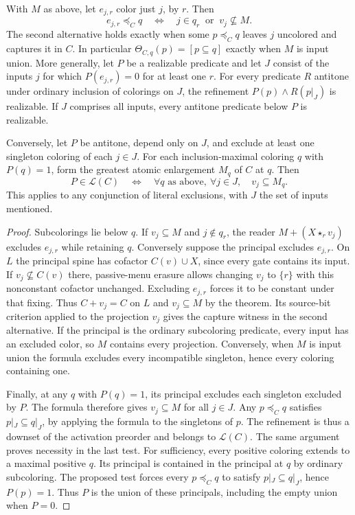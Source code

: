 \begin{corollary}
\label{core:cor:singleton-color-refinement}
With $M$ as above, let $e_{j,r}$ color just $j$, by $r$. Then
\[
 e_{j,r}\preceq_C q
 \quad\Longleftrightarrow\quad j\in q_r\ \text{ or }\ v_j\nsubseteq M .
\]
The second alternative holds exactly when some $p\preceq_Cq$ leaves
$j$ uncolored and captures it in $C$.
In particular $\Theta_{C,q}(p)=[p\subseteq q]$ exactly when $M$
is input union. More generally, let $P$ be a realizable predicate and
let $J$ consist of the inputs $j$ for which $P(e_{j,r})=0$ for at
least one $r$. For every predicate $R$ antitone under ordinary
inclusion of colorings on $J$, the refinement
$P(p)\land R(p|_J)$ is realizable. If $J$ comprises all inputs,
every antitone predicate below $P$ is realizable.

Conversely, let $P$ be antitone, depend only on $J$, and exclude at
least one singleton coloring of each $j\in J$. For each
inclusion-maximal coloring $q$ with $P(q)=1$, form the greatest
atomic enlargement $M_q$ of $C$ at $q$. Then
\[
 P\in\mathcal L(C)\quad\Longleftrightarrow\quad
 \forall q\text{ as above},\ \forall j\in J,\quad v_j\subseteq M_q .
\]
This applies to any conjunction of literal exclusions, with $J$ the
set of inputs mentioned.
\end{corollary}
\begin{proof}
Subcolorings lie below $q$. If $v_j\subseteq M$ and $j\notin q_r$,
the reader $M+(X\star_r v_j)$ excludes $e_{j,r}$ while retaining $q$.
Conversely suppose the principal excludes $e_{j,r}$. On $L$ the
principal spine has cofactor $C(v)\cup X$, since every gate contains
its input. If $v_j\nsubseteq C(v)$ there, passive-menu erasure
allows changing $v_j$ to $\{r\}$ with this nonconstant cofactor
unchanged. Excluding $e_{j,r}$ forces it to be constant under that
fixing. Thus $C+v_j=C$ on $L$ and $v_j\subseteq M$ by the theorem.
Its source-bit criterion applied to the projection $v_j$ gives the
capture witness in the second alternative.
If the principal is the ordinary subcoloring predicate, every input
has an excluded color, so $M$ contains every projection. Conversely,
when $M$ is input union the formula excludes every incompatible
singleton, hence every coloring containing one.

Finally, at any $q$ with $P(q)=1$, its principal excludes each
singleton excluded by $P$. The formula therefore gives $v_j\subseteq M$
for all $j\in J$. Any $p\preceq_Cq$ satisfies $p|_J\subseteq q|_J$,
by applying the formula to the singletons of $p$. The refinement is
thus a downset of the activation preorder and belongs to $\mathcal L(C)$.
The same argument proves necessity in the last test. For sufficiency,
every positive coloring extends to a maximal positive $q$. Its
principal is contained in the principal at $q$ by ordinary
subcoloring. The proposed test forces every $p\preceq_Cq$ to
satisfy $p|_J\subseteq q|_J$, hence $P(p)=1$. Thus $P$ is the
union of these principals, including the empty union when $P=0$.
\end{proof}

